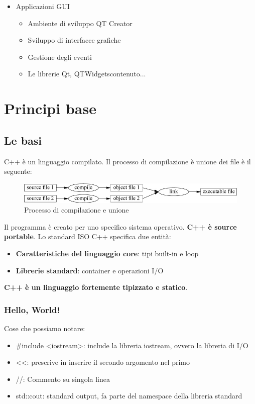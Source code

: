 \documentclass[11pt,a4paper]{book}
\begin{document}
\begin{itemize}
	\item Applicazioni GUI
	\begin{itemize}
		\item Ambiente di sviluppo QT Creator
		\item Sviluppo di interfacce grafiche
		\item Gestione degli eventi
		\item Le librerie Qt, QTWidgetscontenuto...
	\end{itemize}
\end{itemize}
\pagebreak

\chapter{Principi base}
\section{Le basi}
C++ è un linguaggio compilato. Il processo di compilazione è unione dei file è il seguente:
\begin{figure}[h!]
	\begin{center}
		\includegraphics[scale=0.5]{img/001.jpg}
		\caption{Processo di compilazione e unione}
		\label{fig: 001}
	\end{center}
\end{figure}
Il programma è creato per uno specifico sistema operativo. \textbf{C++ è source portable}. Lo standard ISO C++ specifica due entità:
\begin{itemize}
	\item \textbf{Caratteristiche del linguaggio core}: tipi built-in e loop
	\item \textbf{Librerie standard}: container e operazioni I/O
\end{itemize}
\textbf{C++ è un linguaggio fortemente tipizzato e statico}.

\subsection{Hello, World!}
\label{code: 001}
Cose che possiamo notare:
\begin{itemize}
	\item \#include <iostream>: include la libreria iostream, ovvero la libreria di I/O
	\item <<: prescrive in inserire il secondo argomento nel primo
	\item //: Commento su singola linea
	\item std::cout: standard output, fa parte del namespace della libreria standard
\end{itemize}
\end{document}
